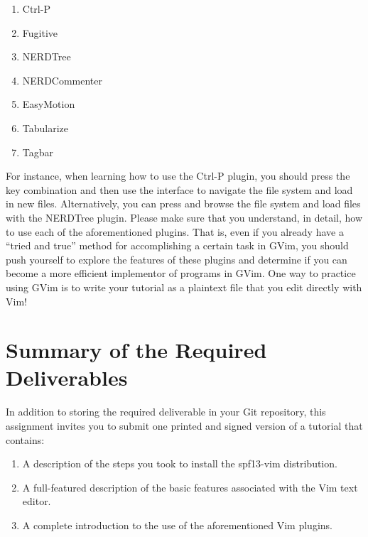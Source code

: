 \vspace*{-.1in}
\begin{enumerate}
  \itemsep 0em
  \item Ctrl-P
  \item Fugitive
  \item NERDTree
  \item NERDCommenter
  \item EasyMotion
  \item Tabularize
  \item Tagbar
\end{enumerate}
\vspace*{-.1in}

For instance, when learning how to use the Ctrl-P plugin, you should press the key combination {\tt <ctrl-p>} and then
use the interface to navigate the file system and load in new files.  Alternatively, you can press {\tt <ctrl-E>} and
browse the file system and load files with the NERDTree plugin. Please make sure that you understand, in detail, how to
use each of the aforementioned plugins.  That is, even if you already have a ``tried and true'' method for
accomplishing a certain task in GVim, you should push yourself to explore the features of these plugins and determine if
you can become a more efficient implementor of programs in GVim. One way to practice using GVim is to write your
tutorial as a plaintext file that you edit directly with Vim!

\section*{Summary of the Required Deliverables}

In addition to storing the required deliverable in your Git repository, this assignment invites you to submit one
printed and signed version of a tutorial that contains:

\begin{enumerate}

  \itemsep 0em
  \item A description of the steps you took to install the spf13-vim distribution.

  \item A full-featured description of the basic features associated with the Vim text editor.

  \item A complete introduction to the use of the aforementioned Vim plugins.

\end{enumerate}

